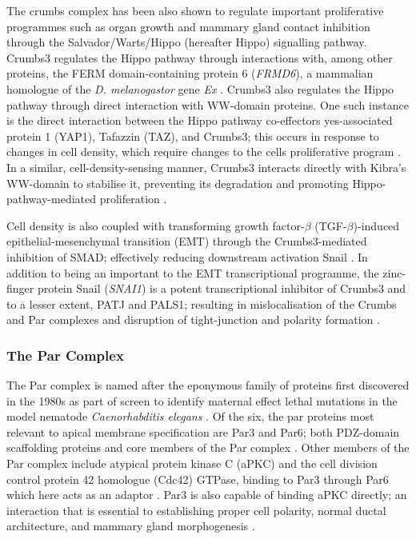 The crumbs complex has been also shown to regulate important proliferative
programmes such as organ growth and mammary gland contact inhibition through the
Salvador/Warts/Hippo (hereafter Hippo) signalling pathway. Crumbs3 regulates the
Hippo pathway through interactions with, among other proteins, the FERM
domain-containing protein 6 ({\it FRMD6}), a mammalian homologue of the
{\it D. melanogastor} gene {\it Ex} \citep{robinson2010}. Crumbs3
also regulates the Hippo pathway through direct interaction with WW-domain proteins.
One such instance is the direct interaction between the Hippo pathway co-effectors
yes-associated protein 1 (YAP1), Tafazzin (TAZ), and Crumbs3; this occurs in
response to changes in cell density, which require changes to the cells
proliferative program \citep{varelas2010,szymaniak2015}. In a similar, cell-density-sensing
manner, Crumbs3 interacts directly with Kibra's WW-domain to stabilise it,
preventing its degradation and promoting Hippo-pathway-mediated proliferation
\citep{moleirinho2013,mao2017}.\par

Cell density is also coupled with transforming growth factor-$\beta$ (TGF-$\beta$)-induced
epithelial-mesenchymal transition (EMT) through the Crumbs3-mediated inhibition
of SMAD; effectively reducing downstream activation Snail
\citep{varelas2010}. In addition to being an important to the
EMT transcriptional programme, the zinc-finger protein Snail ({\it SNAI1}) is a potent
transcriptional inhibitor of Crumbs3 and to a lesser extent, PATJ and PALS1;
resulting in mislocalisation of the Crumbs and Par complexes and disruption of
tight-junction and polarity formation \citep{wang2013, whiteman2014}.\par

\subsubsection{The Par Complex}
The Par complex is named after the eponymous family of proteins first
discovered in the 1980s as part of screen to identify maternal effect lethal
mutations in the model nematode {\it Caenorhabditis elegans}
\citep{kemphues1988,goldstein2007}.
Of the six, the par proteins most relevant to apical membrane specification are
Par3 and Par6; both PDZ-domain scaffolding proteins and core members of the Par
complex \citep{yu2014,hung1999}. Other
members of the Par complex include atypical protein kinase C (aPKC) and the
cell division control protein 42 homologue (Cdc42) GTPase, binding to Par3
through Par6 which here acts as an adaptor \citep{joberty2000}.
Par3 is also capable of binding aPKC directly; an interaction that is essential
to establishing proper cell polarity, normal ductal architecture, and mammary
gland morphogenesis \citep{nagai2002, mccaffrey2009}.\par

